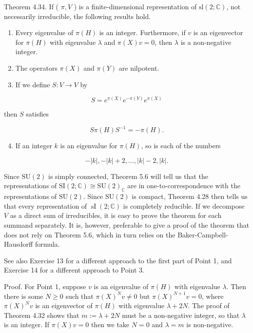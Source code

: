 \documentclass[10pt, letterpaper]{article}
\begin{document}
Theorem 4.34. If ( $\pi, V$ ) is a finite-dimensional representation of $\mathrm{sl}(2 ; \mathbb{C})$, not necessarily irreducible, the following results hold.

\begin{enumerate}
  \item Every eigenvalue of $\pi(H)$ is an integer. Furthermore, if $v$ is an eigenvector for $\pi(H)$ with eigenvalue $\lambda$ and $\pi(X) v=0$, then $\lambda$ is a non-negative integer.
  \item The operators $\pi(X)$ and $\pi(Y)$ are nilpotent.
  \item If we define $S: V \rightarrow V$ by
\end{enumerate}

$$
S=e^{\pi(X)} e^{-\pi(Y)} e^{\pi(X)}
$$

then $S$ satisfies

$$
S \pi(H) S^{-1}=-\pi(H) .
$$

\begin{enumerate}
  \setcounter{enumi}{3}
  \item If an integer $k$ is an eigenvalue for $\pi(H)$, so is each of the numbers
\end{enumerate}

$$
-|k|,-|k|+2, \ldots,|k|-2,|k| .
$$

Since $\mathrm{SU}(2)$ is simply connected, Theorem 5.6 will tell us that the representations of $\mathrm{SI}(2 ; \mathbb{C}) \cong \mathrm{SU}(2)_{\mathbb{C}}$ are in one-to-correspondence with the representations of $\mathrm{SU}(2)$. Since $\mathrm{SU}(2)$ is compact, Theorem 4.28 then tells us that every representation of $\operatorname{sI}(2 ; \mathbb{C})$ is completely reducible. If we decompose $V$ as a direct sum of irreducibles, it is easy to prove the theorem for each summand separately. It is, however, preferable to give a proof of the theorem that does not rely on Theorem 5.6, which in turn relies on the Baker-Campbell-Hausdorff formula.

See also Exercise 13 for a different approach to the first part of Point 1, and Exercise 14 for a different approach to Point 3.

Proof. For Point 1, suppose $v$ is an eigenvalue of $\pi(H)$ with eigenvalue $\lambda$. Then there is some $N \geq 0$ such that $\pi(X)^{N} v \neq 0$ but $\pi(X)^{N+1} v=0$, where $\pi(X)^{N} v$ is an eigenvector of $\pi(H)$ with eigenvalue $\lambda+2 N$. The proof of Theorem 4.32 shows that $m:=\lambda+2 N$ must be a non-negative integer, so that $\lambda$ is an integer. If $\pi(X) v=0$ then we take $N=0$ and $\lambda=m$ is non-negative.
\end{document}

